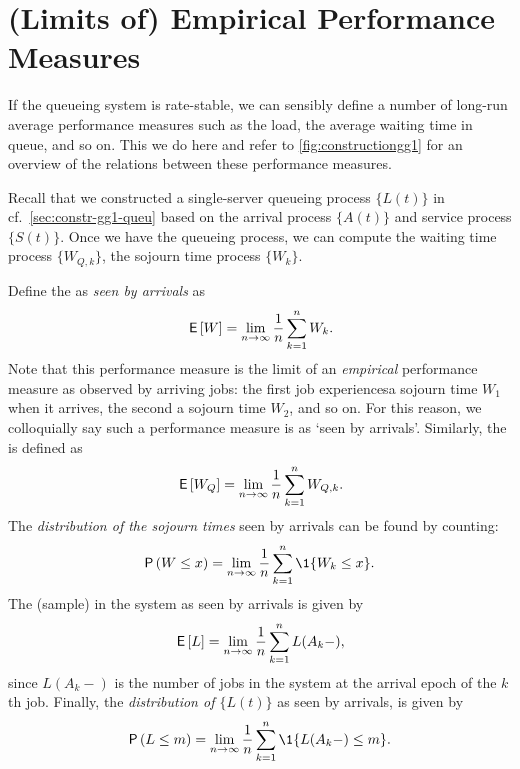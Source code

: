 \section{(Limits of) Empirical Performance Measures}
\label{sec:limits-of-emperical}

If the queueing system is rate-stable, we can sensibly define a number of long-run average performance measures such as the load, the average waiting time in queue, and so on. 
This we do here and refer to \cref{fig:constructiongg1} for an overview of the relations between these performance measures.




Recall that we constructed a single-server queueing process $\{L(t)\}$ in cf.~\cref{sec:constr-gg1-queu} based on the arrival process $\{A(t)\}$ and service process $\{S(t)\}$.
Once we have the queueing process, we can compute the waiting time process $\{W_{Q,k}\}$, the sojourn time process $\{W_{k}\}$.


Define the  as \emph{seen by  arrivals} as
\begin{equation}\label{eq:49}
 \,\mathsf{E}\left[W\right] = \lim_{n\to\infty} \frac 1n\sum_{k=1}^n W_k.
\end{equation}
Note that this performance measure is the limit of an \emph{empirical} performance measure as observed by arriving jobs: the first job experiencesa sojourn time $W_1$ when it arrives, the second a sojourn time $W_2$, and so on.
For this reason, we colloquially say such a performance measure is as `seen by arrivals'.
Similarly, the  is defined as
\begin{equation}\label{eq:50}
 \,\mathsf{E}\left[W_Q\right] = \lim_{n\to\infty} \frac 1 n\sum_{k=1}^n W_{Q,k}.
\end{equation}
The \emph{distribution of the sojourn times} seen by arrivals can be found by counting:
\begin{equation}\label{eq:48}
 \P{W \leq x} = \lim_{n\to\infty} \frac 1n\sum_{k=1}^n \1{W_k\leq x}.
\end{equation}
The (sample)  in the system as seen by arrivals is given by
\begin{equation}\label{eq:EQ}
\,\mathsf{E}\left[L\right] = \lim_{n\to\infty}\frac 1 n \sum_{k=1}^n L(A_k-),
\end{equation}
since $L(A_k-)$ is the number of jobs in the system at the arrival epoch of the $k$th job.
Finally, the \emph{distribution of $\{L(t)\}$} as seen by arrivals, is given by
\begin{equation}\label{eq:Qm}
\P{L\leq m} = \lim_{n\to\infty} \frac 1 n \sum_{k=1}^n \1{L(A_k-) \leq m}.
\end{equation}




